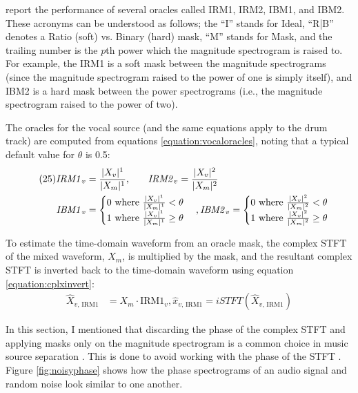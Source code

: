\documentclass[report.tex]{subfiles}
\begin{document}
\textcite{sisec2018} report the performance of several oracles called IRM1, IRM2, IBM1, and IBM2. These acronyms can be understood as follows; the ``I'' stands for Ideal, ``R|B'' denotes a Ratio (soft) vs. Binary (hard) mask, ``M'' stands for Mask, and the trailing number is the $p$th power which the magnitude spectrogram is raised to. For example, the IRM1 is a soft mask between the magnitude spectrograms (since the magnitude spectrogram raised to the power of one is simply itself), and IBM2 is a hard mask between the power spectrograms (i.e., the magnitude spectrogram raised to the power of two).

The oracles for the vocal source (and the same equations apply to the drum track) are computed from equations \eqref{equation:vocaloracles}, noting that a typical default value for $\theta$ is 0.5:
\begin{align}\tag{25}\label{equation:vocaloracles}
	\nonumber \mathit{IRM1}_{v} &= \frac{|X_{v}|^{1}}{|X_{m}|^{1}}\text{,\qquad}
	\nonumber \mathit{IRM2}_{v} = \frac{|X_{v}|^{2}}{|X_{m}|^{2}}\\
	\nonumber \mathit{IBM1}_{v} &= \begin{cases}
		0 \text{ where } \frac{|X_{v}|^{1}}{|X_{m}|^{1}} < \theta\\
		1 \text{ where } \frac{|X_{v}|^{1}}{|X_{m}|^{1}} \ge \theta
	\end{cases},
	\nonumber \mathit{IBM2}_{v} = \begin{cases}
		0 \text{ where } \frac{|X_{v}|^{2}}{|X_{m}|^{2}} < \theta\\
		1 \text{ where } \frac{|X_{v}|^{2}}{|X_{m}|^{2}} \ge \theta
	\end{cases}
\end{align}

To estimate the time-domain waveform from an oracle mask, the complex STFT of the mixed waveform, $X_{m}$, is multiplied by the mask, and the resultant complex STFT is inverted back to the time-domain waveform using equation \eqref{equation:cplxinvert}:
\begin{align}\tag{26}\label{equation:cplxinvert}
	\nonumber \hat{X}_{v\text{, IRM1}} &= X_{m} \cdot \text{IRM1}_{v}, \hat{x}_{v\text{, IRM1}} = \mathit{iSTFT}(\hat{X}_{v\text{, IRM1}})
\end{align}

In this section, I mentioned that discarding the phase of the complex STFT and applying masks only on the magnitude spectrogram is a common choice in music source separation \parencite{fitzgerald1, fitzgerald2, driedger, umx, plumbley1, plumbley2}. This is done to avoid working with the phase of the STFT \parencite{ditchphase}. Figure \ref{fig:noisyphase} shows how the phase spectrograms of an audio signal and random noise look similar to one another.
\end{document}
